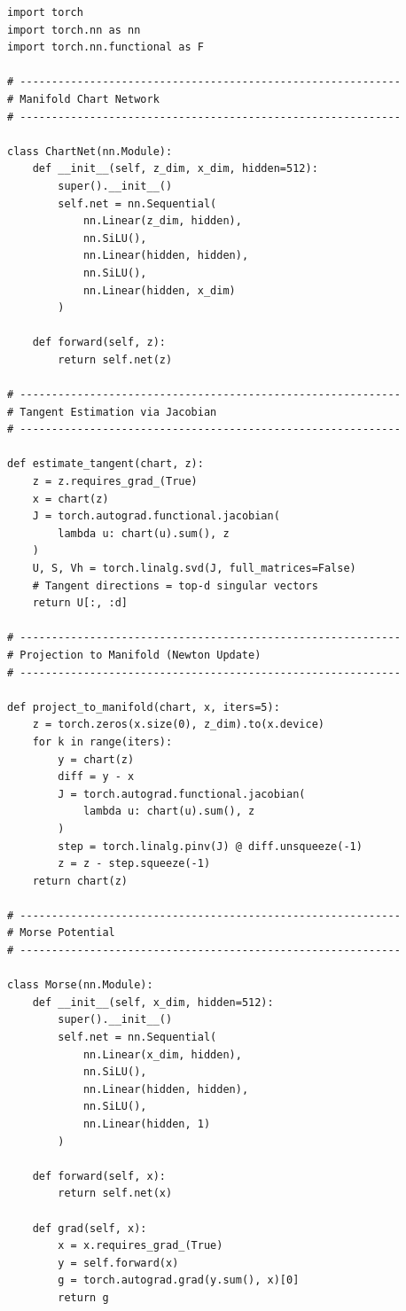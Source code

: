 \documentclass[11pt,a4paper,twocolumn]{article}
\begin{document}
\begin{verbatim}
import torch
import torch.nn as nn
import torch.nn.functional as F

# ------------------------------------------------------------
# Manifold Chart Network
# ------------------------------------------------------------

class ChartNet(nn.Module):
    def __init__(self, z_dim, x_dim, hidden=512):
        super().__init__()
        self.net = nn.Sequential(
            nn.Linear(z_dim, hidden),
            nn.SiLU(),
            nn.Linear(hidden, hidden),
            nn.SiLU(),
            nn.Linear(hidden, x_dim)
        )

    def forward(self, z):
        return self.net(z)

# ------------------------------------------------------------
# Tangent Estimation via Jacobian
# ------------------------------------------------------------

def estimate_tangent(chart, z):
    z = z.requires_grad_(True)
    x = chart(z)
    J = torch.autograd.functional.jacobian(
        lambda u: chart(u).sum(), z
    )
    U, S, Vh = torch.linalg.svd(J, full_matrices=False)
    # Tangent directions = top-d singular vectors
    return U[:, :d]

# ------------------------------------------------------------
# Projection to Manifold (Newton Update)
# ------------------------------------------------------------

def project_to_manifold(chart, x, iters=5):
    z = torch.zeros(x.size(0), z_dim).to(x.device)
    for k in range(iters):
        y = chart(z)
        diff = y - x
        J = torch.autograd.functional.jacobian(
            lambda u: chart(u).sum(), z
        )
        step = torch.linalg.pinv(J) @ diff.unsqueeze(-1)
        z = z - step.squeeze(-1)
    return chart(z)

# ------------------------------------------------------------
# Morse Potential
# ------------------------------------------------------------

class Morse(nn.Module):
    def __init__(self, x_dim, hidden=512):
        super().__init__()
        self.net = nn.Sequential(
            nn.Linear(x_dim, hidden),
            nn.SiLU(),
            nn.Linear(hidden, hidden),
            nn.SiLU(),
            nn.Linear(hidden, 1)
        )

    def forward(self, x):
        return self.net(x)

    def grad(self, x):
        x = x.requires_grad_(True)
        y = self.forward(x)
        g = torch.autograd.grad(y.sum(), x)[0]
        return g


\end{verbatim}
\end{document}
